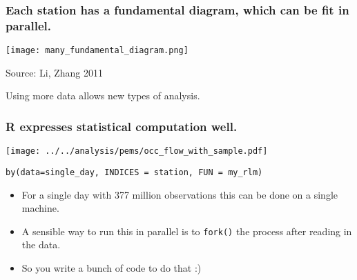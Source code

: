 \documentclass{beamer}
\begin{document}
\begin{frame}

    \frametitle{Each station has a fundamental diagram, which can be fit in
    parallel.}

\centerline{\texttt{[image: many\_fundamental\_diagram.png]}}

Source: Li, Zhang 2011

Using more data allows new types of analysis.

%
%
%

\end{frame}
\begin{frame}[fragile]

    \frametitle{R expresses statistical computation well.}


    \centerline{\texttt{[image: ../../analysis/pems/occ\_flow\_with\_sample.pdf]}}

\begin{verbatim}
by(data=single_day, INDICES = station, FUN = my_rlm)
\end{verbatim}

    \pause

    \begin{itemize}
        \item For a single day with 377 million observations this can be
            done on a single machine.
        \item A sensible way to run this in parallel is to \texttt{fork()}
            the process after reading in the data.
        \item So you write a bunch of code to do that :)
    \end{itemize}

\end{frame}
\end{document}
